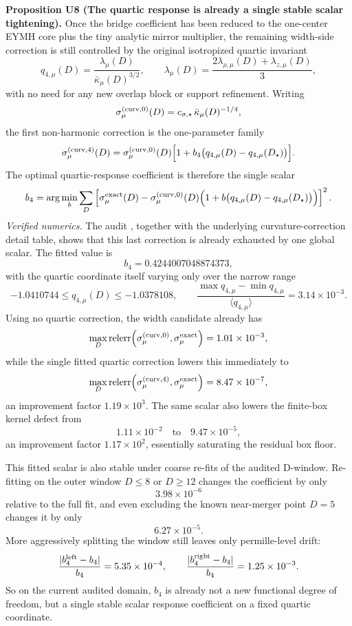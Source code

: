 \documentclass[aps,prd,onecolumn,notitlepage,nofootinbib,superscriptaddress,11pt,floatfix]{revtex4-2}
\begin{document}
\medskip\noindent\textbf{Proposition U8 (The quartic response is already a single stable scalar tightening).}
Once the bridge coefficient has been reduced to the one-center EYMH core plus the tiny analytic mirror multiplier, the remaining width-side correction is still controlled by the original isotropized quartic invariant
\[
q_{4,\mu}(D)=\frac{\lambda_\mu(D)}{\bar\kappa_\mu(D)^{3/2}},
\qquad
\lambda_\mu(D)=\frac{2\lambda_{\rho,\mu}(D)+\lambda_{z,\mu}(D)}{3},
\]
with no need for any new overlap block or support refinement.  Writing
\[
\sigma_\mu^{\rm(curv,0)}(D)=c_{\sigma,\star}\,\bar\kappa_\mu(D)^{-1/4},
\]
the first non-harmonic correction is the one-parameter family
\[
\sigma_\mu^{\rm(curv,4)}(D)
=
\sigma_\mu^{\rm(curv,0)}(D)
\Bigl[1+b_4\bigl(q_{4,\mu}(D)-q_{4,\mu}(D_\star)\bigr)\Bigr].
\]
The optimal quartic-response coefficient is therefore the single scalar
\[
b_4
=
\arg\min_b
\sum_D
\left[
\sigma_\mu^{\rm exact}(D)
-\sigma_\mu^{\rm(curv,0)}(D)\Bigl(1+b\bigl(q_{4,\mu}(D)-q_{4,\mu}(D_\star)\bigr)\Bigr)
\right]^2.
\]
\emph{Verified numerics.}
The audit , together with the underlying curvature-correction detail table, shows that this last correction is already exhausted by one global scalar.  The fitted value is
\[
b_4=0.4244007048874373,
\]
with the quartic coordinate itself varying only over the narrow range
\[
-1.0410744\le q_{4,\mu}(D)\le -1.0378108,
\qquad
\frac{\max q_{4,\mu}-\min q_{4,\mu}}{\langle q_{4,\mu}\rangle}=3.14\times10^{-3}.
\]
Using no quartic correction, the width candidate already has
\[
\max_D {\rm relerr}\!\left(\sigma_\mu^{\rm(curv,0)},\sigma_\mu^{\rm exact}\right)
=1.01\times10^{-3},
\]
while the single fitted quartic correction lowers this immediately to
\[
\max_D {\rm relerr}\!\left(\sigma_\mu^{\rm(curv,4)},\sigma_\mu^{\rm exact}\right)
=8.47\times10^{-7},
\]
an improvement factor \(1.19\times10^3\).  The same scalar also lowers the finite-box kernel defect from
\[
1.11\times10^{-2}\quad\text{to}\quad 9.47\times10^{-5},
\]
an improvement factor \(1.17\times10^2\), essentially saturating the residual box floor.

This fitted scalar is also stable under coarse re-fits of the audited D-window.  Re-fitting on the outer window \(D\le 8\) or \(D\ge 12\) changes the coefficient by only
\[
3.98\times10^{-6}
\]
relative to the full fit, and even excluding the known near-merger point \(D=5\) changes it by only
\[
6.27\times10^{-5}.
\]
More aggressively splitting the window still leaves only permille-level drift:
\[
\frac{|b_4^{\rm left}-b_4|}{b_4}=5.35\times10^{-4},
\qquad
\frac{|b_4^{\rm right}-b_4|}{b_4}=1.25\times10^{-3}.
\]
So on the current audited domain, \(b_4\) is already not a new functional degree of freedom, but a single stable scalar response coefficient on a fixed quartic coordinate.
\end{document}
